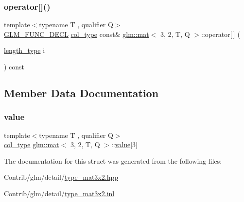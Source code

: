 \mbox{\label{structglm_1_1mat_3_013_00_012_00_01_t_00_01_q_01_4_a73a97c49ef108592edf14b0ac70f8264}} 
\subsubsection{\texorpdfstring{operator[]()}{operator[]()}\hspace{0.1cm}{\footnotesize\ttfamily [2/2]}}
{\footnotesize\ttfamily template$<$typename T , qualifier Q$>$ \\
\mbox{\hyperlink{setup_8hpp_ab2d052de21a70539923e9bcbf6e83a51}{G\+L\+M\+\_\+\+F\+U\+N\+C\+\_\+\+D\+E\+CL}} \mbox{\hyperlink{structglm_1_1mat_3_013_00_012_00_01_t_00_01_q_01_4_aa610dcaaae528e1eea8bdaaa435ad3a4}{col\+\_\+type}} const\& \mbox{\hyperlink{structglm_1_1mat}{glm\+::mat}}$<$ 3, 2, T, Q $>$\+::operator\mbox{[}$\,$\mbox{]} (\begin{DoxyParamCaption}\item[{\mbox{\hyperlink{structglm_1_1mat_3_013_00_012_00_01_t_00_01_q_01_4_ac2f268fa5e899b2a6ad8139183ed61d4}{length\+\_\+type}}}]{i }\end{DoxyParamCaption}) const}



\subsection{Member Data Documentation}
\mbox{\label{structglm_1_1mat_3_013_00_012_00_01_t_00_01_q_01_4_a49358f69d92f2817e5ee764a5ae2cc8f}} 
\subsubsection{\texorpdfstring{value}{value}}
{\footnotesize\ttfamily template$<$typename T , qualifier Q$>$ \\
\mbox{\hyperlink{structglm_1_1mat_3_013_00_012_00_01_t_00_01_q_01_4_aa610dcaaae528e1eea8bdaaa435ad3a4}{col\+\_\+type}} \mbox{\hyperlink{structglm_1_1mat}{glm\+::mat}}$<$ 3, 2, T, Q $>$\+::\mbox{\hyperlink{_s_d_l__opengl__glext_8h_a8ad81492d410ff2ac11f754f4042150f}{value}}\mbox{[}3\mbox{]}\hspace{0.3cm}{\ttfamily [private]}}



The documentation for this struct was generated from the following files\+:\begin{DoxyCompactItemize}
\item 
Contrib/glm/detail/\mbox{\hyperlink{type__mat3x2_8hpp}{type\+\_\+mat3x2.\+hpp}}\item 
Contrib/glm/detail/\mbox{\hyperlink{type__mat3x2_8inl}{type\+\_\+mat3x2.\+inl}}\end{DoxyCompactItemize}
